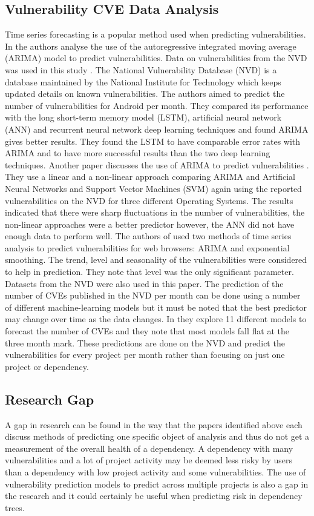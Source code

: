 \documentclass[conference]{IEEEtran}
\begin{document}
\subsection{Vulnerability CVE Data Analysis}
Time series forecasting is a popular method used when predicting vulnerabilities. In \cite{gencer_time_2021} the authors analyse the use of the autoregressive integrated moving average (ARIMA) model to predict vulnerabilities. Data on vulnerabilities from the NVD was used in this study \cite{noauthor_vulnerability_nodate}. The National Vulnerability Database (NVD) is a database maintained by the National Institute for Technology which keeps updated details on known vulnerabilities. The authors aimed to predict the number of vulnerabilities for Android per month. They compared its performance with the long short-term memory model (LSTM), artificial neural network (ANN) and recurrent neural network deep learning techniques and found ARIMA gives better results. They found the LSTM to have comparable error rates with ARIMA and to have more successful results than the two deep learning techniques. Another paper discusses the use of ARIMA to predict vulnerabilities \cite{pokhrel_cybersecurity_2017}. They use a linear and a non-linear approach comparing ARIMA and Artificial Neural Networks and Support Vector Machines (SVM) again using the reported vulnerabilities on the NVD for three different Operating Systems. The results indicated that there were sharp fluctuations in the number of vulnerabilities, the non-linear approaches were a better predictor however, the ANN did not have enough data to perform well. The authors of \cite{roumani_time_2015} used two methods of time series analysis to predict vulnerabilities for web browsers: ARIMA and exponential smoothing. The trend, level and seasonality of the vulnerabilities were considered to help in prediction. They note that level was the only significant parameter. Datasets from the NVD were also used in this paper. The prediction of the number of CVEs published in the NVD per month can be done using a number of different machine-learning models but it must be noted that the best predictor may change over time as the data changes. In \cite{leverett_vulnerability_2021} they explore 11 different models to forecast the number of CVEs and they note that most models fall flat at the three month mark. These predictions are done on the NVD and predict the vulnerabilities for every project per month rather than focusing on just one project or dependency. 

\subsection{Research Gap}
A gap in research can be found in the way that the papers identified above each discuss methods of predicting one specific object of analysis and thus do not get a measurement of the overall health of a dependency. A dependency with many vulnerabilities and a lot of project activity may be deemed less risky by users than a dependency with low project activity and some vulnerabilities. The use of vulnerability prediction models to predict across multiple projects is also a gap in the research and it could certainly be useful when predicting risk in dependency trees. 
\end{document}

